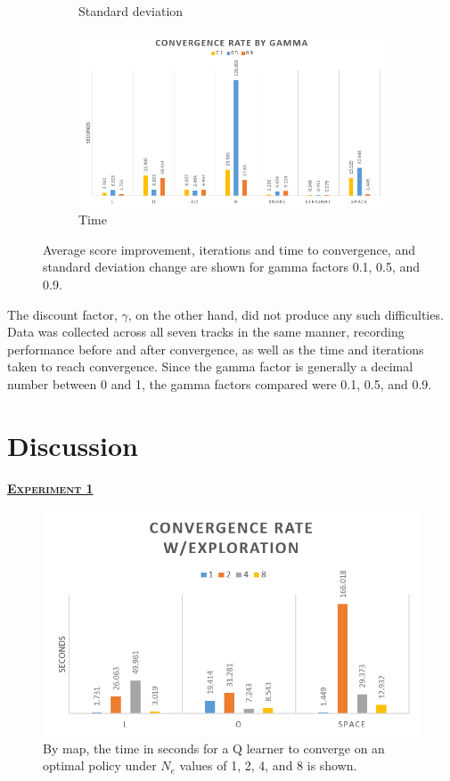\documentclass[12pt, letter]{article}
\newlength{\remaining}
\newcommand{\titleline}[1]{%
\setlength{\remaining}{\textwidth-\widthof{\textsc{#1}}}
\noindent\underline{\textsc{\textbf{#1}}\hspace*{\remaining}}\par}
\begin{document}
\begin{figure}[h!]
\begin{subfigure}[b]{0.49\textwidth}
        \caption{Standard deviation}
    \end{subfigure}
    \begin{subfigure}[b]{0.49\textwidth}
        \includegraphics[width=1\textwidth]{img/gamma/Time}
        \caption{Time}
    \end{subfigure}
    \caption{Average score improvement, iterations and time to convergence, and standard deviation change are shown for gamma factors 0.1, 0.5, and 0.9.}
    \label{fig:gammaTimeIterAvgScoreStDev}
\end{figure}
\vspace{-1em}

The discount factor, $\gamma$, on the other hand, did not produce any such difficulties. Data was collected across all seven tracks in the same manner, recording performance before and after convergence, as well as the time and iterations taken to reach convergence.  Since the gamma factor is generally a decimal number between 0 and 1, the gamma factors compared were 0.1, 0.5, and 0.9.

\clearpage
\section{Discussion}

\titleline{Experiment 1}

\begin{figure} 
    \centering
  \includegraphics[width=.7\textwidth]{img/minE/Time}
  \caption{By map, the time in seconds for a Q learner to converge on an optimal policy under $N_e$ values of 1, 2, 4, and 8 is shown.}
  \label{fig:minETime}
\end{figure}
\end{document}
